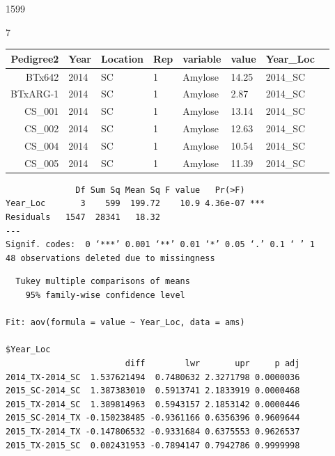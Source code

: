 \documentclass[11pt]{article}
\begin{document}
    \begin{enumerate*}
\item 1599
\item 7
\end{enumerate*}


    
    \begin{tabular}{r|lllllll}
 Pedigree2 & Year & Location & Rep & variable & value & Year\_Loc\\
\hline
	 BTx642    & 2014      & SC        & 1         & Amylose   & 14.25     & 2014\_SC\\
	 BTxARG-1  & 2014      & SC        & 1         & Amylose   &  2.87     & 2014\_SC\\
	 CS\_001   & 2014       & SC         & 1          & Amylose    & 13.14      & 2014\_SC \\
	 CS\_002   & 2014       & SC         & 1          & Amylose    & 12.63      & 2014\_SC \\
	 CS\_004   & 2014       & SC         & 1          & Amylose    & 10.54      & 2014\_SC \\
	 CS\_005   & 2014       & SC         & 1          & Amylose    & 11.39      & 2014\_SC \\
\end{tabular}


    
    
    \begin{verbatim}
              Df Sum Sq Mean Sq F value   Pr(>F)    
Year_Loc       3    599  199.72    10.9 4.36e-07 ***
Residuals   1547  28341   18.32                     
---
Signif. codes:  0 ‘***’ 0.001 ‘**’ 0.01 ‘*’ 0.05 ‘.’ 0.1 ‘ ’ 1
48 observations deleted due to missingness
    \end{verbatim}

    
    
    \begin{verbatim}
  Tukey multiple comparisons of means
    95% family-wise confidence level

Fit: aov(formula = value ~ Year_Loc, data = ams)

$Year_Loc
                        diff        lwr       upr     p adj
2014_TX-2014_SC  1.537621494  0.7480632 2.3271798 0.0000036
2015_SC-2014_SC  1.387383010  0.5913741 2.1833919 0.0000468
2015_TX-2014_SC  1.389814963  0.5943157 2.1853142 0.0000446
2015_SC-2014_TX -0.150238485 -0.9361166 0.6356396 0.9609644
2015_TX-2014_TX -0.147806532 -0.9331684 0.6375553 0.9626537
2015_TX-2015_SC  0.002431953 -0.7894147 0.7942786 0.9999998

    \end{verbatim}
\end{document}
